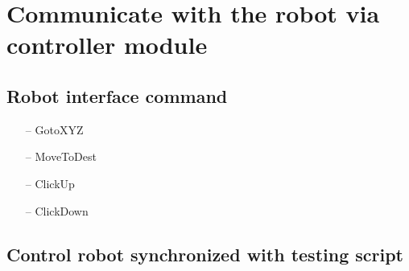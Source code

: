 \chapter{Communicate with the robot via controller module}
\section{Robot interface command}
\begin{itemize}
	\item[--] GotoXYZ
	\item[--] MoveToDest
	\item[--] ClickUp
	\item[--] ClickDown
\end{itemize}

\section{Control robot synchronized with testing script}
